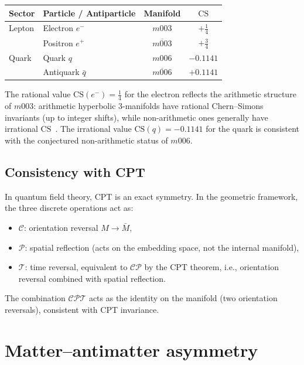 \documentclass[12pt]{article}
\theoremstyle{definition}
\begin{document}
\begin{center}
\begin{tabular}{llcc}
\toprule
Sector & Particle / Antiparticle & Manifold & $\mathrm{CS}$ \\
\midrule
Lepton & Electron $e^-$ & $m003$ & $+\tfrac{1}{4}$ \\
       & Positron $e^+$ & $\overline{m003}$ & $+\tfrac{3}{4}$\footnotemark \\
\midrule
Quark  & Quark $q$      & $m006$ & $-0.1141$ \\
       & Antiquark $\bar{q}$ & $\overline{m006}$ & $+0.1141$ \\
\bottomrule
\end{tabular}
\end{center}
\footnotetext{Chern--Simons invariants are taken modulo~1 in the range
$[0,1)$. Hence $-\tfrac{1}{4} \equiv \tfrac{3}{4}$.}

The rational value $\mathrm{CS}(e^-) = \tfrac{1}{4}$ for the electron
reflects the arithmetic structure of $m003$: arithmetic hyperbolic
3-manifolds have rational Chern--Simons invariants (up to integer
shifts), while non-arithmetic ones generally have irrational
$\mathrm{CS}$~\cite{Chinburg98}. The irrational value
$\mathrm{CS}(q) = -0.1141$ for the quark is consistent with the
conjectured non-arithmetic status of $m006$.

\subsection{Consistency with CPT}

In quantum field theory, CPT is an exact symmetry. In the geometric
framework, the three discrete operations act as:
\begin{itemize}
  \item $\mathcal{C}$: orientation reversal $M \to \bar{M}$,
  \item $\mathcal{P}$: spatial reflection (acts on the embedding
    space, not the internal manifold),
  \item $\mathcal{T}$: time reversal, equivalent to $\mathcal{CP}$
    by the CPT theorem, i.e., orientation reversal combined with
    spatial reflection.
\end{itemize}
The combination $\mathcal{CPT}$ acts as the identity on the manifold
(two orientation reversals), consistent with CPT invariance.

\section{Matter--antimatter asymmetry}
\label{sec:asymmetry}
\end{document}
